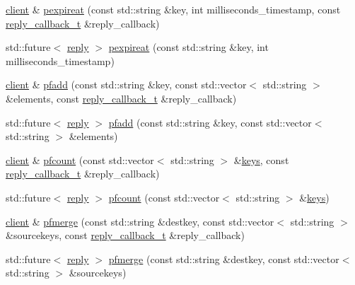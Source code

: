 \begin{DoxyCompactItemize}
\hyperlink{classcpp__redis_1_1client}{client} \& \hyperlink{classcpp__redis_1_1client_a7c872e32ed28a78515c1711e4cafbabf}{pexpireat} (const std\+::string \&key, int milliseconds\+\_\+timestamp, const \hyperlink{classcpp__redis_1_1client_a061a1140d36d2eaeda82b09a0bb3f9f2}{reply\+\_\+callback\+\_\+t} \&reply\+\_\+callback)
\item 
std\+::future$<$ \hyperlink{classcpp__redis_1_1reply}{reply} $>$ \hyperlink{classcpp__redis_1_1client_af7aeaf2681d57fc30c8535c8d5df1e72}{pexpireat} (const std\+::string \&key, int milliseconds\+\_\+timestamp)
\item 
\hyperlink{classcpp__redis_1_1client}{client} \& \hyperlink{classcpp__redis_1_1client_ade84308f3ef8bfc75c092388ec538469}{pfadd} (const std\+::string \&key, const std\+::vector$<$ std\+::string $>$ \&elements, const \hyperlink{classcpp__redis_1_1client_a061a1140d36d2eaeda82b09a0bb3f9f2}{reply\+\_\+callback\+\_\+t} \&reply\+\_\+callback)
\item 
std\+::future$<$ \hyperlink{classcpp__redis_1_1reply}{reply} $>$ \hyperlink{classcpp__redis_1_1client_ac6534e0aaf0ef3c87e312b12fd1a5a97}{pfadd} (const std\+::string \&key, const std\+::vector$<$ std\+::string $>$ \&elements)
\item 
\hyperlink{classcpp__redis_1_1client}{client} \& \hyperlink{classcpp__redis_1_1client_acf88e97aac689b64af0e73843811d837}{pfcount} (const std\+::vector$<$ std\+::string $>$ \&\hyperlink{classcpp__redis_1_1client_acb7845a206b2321e6919c2f38282c322}{keys}, const \hyperlink{classcpp__redis_1_1client_a061a1140d36d2eaeda82b09a0bb3f9f2}{reply\+\_\+callback\+\_\+t} \&reply\+\_\+callback)
\item 
std\+::future$<$ \hyperlink{classcpp__redis_1_1reply}{reply} $>$ \hyperlink{classcpp__redis_1_1client_ad357677011d10800e2595db129bfbfff}{pfcount} (const std\+::vector$<$ std\+::string $>$ \&\hyperlink{classcpp__redis_1_1client_acb7845a206b2321e6919c2f38282c322}{keys})
\item 
\hyperlink{classcpp__redis_1_1client}{client} \& \hyperlink{classcpp__redis_1_1client_aad4f7f35b13e4d236d178ed47a499353}{pfmerge} (const std\+::string \&destkey, const std\+::vector$<$ std\+::string $>$ \&sourcekeys, const \hyperlink{classcpp__redis_1_1client_a061a1140d36d2eaeda82b09a0bb3f9f2}{reply\+\_\+callback\+\_\+t} \&reply\+\_\+callback)
\item 
std\+::future$<$ \hyperlink{classcpp__redis_1_1reply}{reply} $>$ \hyperlink{classcpp__redis_1_1client_acfeb0b2a7adb65d9cb940d96b9d24478}{pfmerge} (const std\+::string \&destkey, const std\+::vector$<$ std\+::string $>$ \&sourcekeys)

\end{DoxyCompactItemize}
